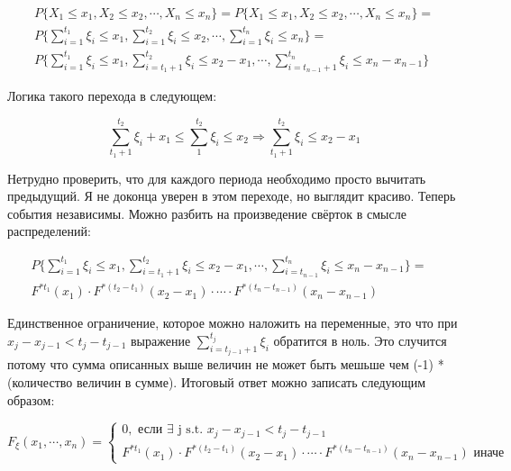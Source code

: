\documentclass[a4paper,12pt]{article}
\begin{document}
\begin{equation*}
\begin{aligned}
P\{  X_1 \le x_1, X_2 \le x_2, \cdots, X_n \le x_n \}  = P\{  X_1 \le x_1, X_2 \le x_2, \cdots, X_n \le x_n \} =\\
P\{  \sum_{i = 1}^{t_1}\xi_i \le x_1, \sum_{i = 1}^{t_2}\xi_i \le x_2, \cdots, \sum_{i = 1}^{t_n}\xi_i \le x_n \} = \\ P\{  \sum_{i = 1}^{t_1}\xi_i \le x_1, \sum_{i = t_1 + 1}^{t_2}\xi_i \le x_2 - x_1, \cdots, \sum_{i = t_{n-1}+1}^{t_n}\xi_i \le x_n - x_{n-1} \}
\end{aligned}
\end{equation*}




Логика такого перехода в следующем:

\[ \sum_{t_1 + 1}^{t_2}\xi_i + x_1 \le \sum_{1}^{t_2} \xi_i \le x_2 \Rightarrow \sum_{t_1 + 1}^{t_2} \xi_i \le x_2 - x_1\]

Нетрудно проверить, что для каждого периода необходимо просто вычитать предыдущий. Я не доконца уверен в этом переходе, но выглядит красиво. Теперь события независимы. Можно разбить на произведение свёрток в смысле распределений:


\begin{equation*}
\begin{aligned}
P\{  \sum_{i = 1}^{t_1}\xi_i \le x_1, \sum_{i = t_1 + 1}^{t_2}\xi_i \le x_2 - x_1, \cdots, \sum_{i = t_{n-1}}^{t_n}\xi_i \le x_n - x_{n-1}\} =&\\ F^{*t_1}(x_1) \cdot F^{*(t_2 - t_1)}(x_2 - x_1) \cdot \cdots \cdot F^{*(t_n - t_{n-1})}(x_n - x_{n-1})
\end{aligned}
\end{equation*}

Единственное ограничение, которое можно наложить на переменные, это что при  $ x_j - x_{j-1}  < t_j - t_{j-1}$ выражение $ \sum_{i = t_{j-1} + 1}^{t_j}\xi_i $ обратится в ноль. Это случится потому что сумма описанных выше величин не может быть мешьше чем (-1) * (количество величин в сумме). Итоговый ответ можно записать следующим образом:

$ F_\xi(x_1, \cdots, x_n) =
\begin{cases}
0, \text{ если } \exists \text{ j s.t. } x_j - x_{j-1}  < t_j - t_{j-1} \\
F^{*t_1}(x_1) \cdot F^{*(t_2 - t_1)}(x_2 - x_1) \cdot \cdots \cdot F^{*(t_n - t_{n-1})}(x_n - x_{n-1}) \text{ иначе }
\end{cases}
$
\end{document}
